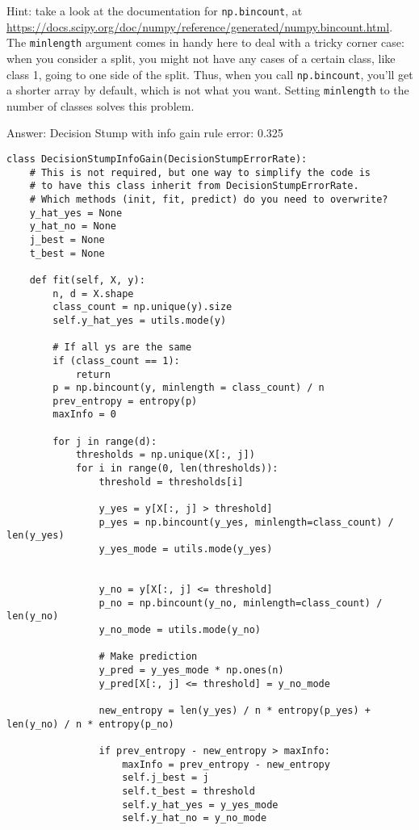 \documentclass{article}
\newcommand{\gre}[1]{\textcolor{gre}{#1}}
\newcommand\ans[1]{\par\gre{Answer: #1}}
\begin{document}
  Hint: take a look at the documentation for \texttt{np.bincount}, at \\
  \url{https://docs.scipy.org/doc/numpy/reference/generated/numpy.bincount.html}.
  The \texttt{minlength} argument comes in handy here to deal with a tricky corner case:
  when you consider a split, you might not have any cases of a certain class, like class 1,
  going to one side of the split. Thus, when you call \texttt{np.bincount}, you'll get
  a shorter array by default, which is not what you want. Setting \texttt{minlength} to the
  number of classes solves this problem.
  \ans{Decision Stump with info gain rule error: 0.325}
  \begin{verbatim}
class DecisionStumpInfoGain(DecisionStumpErrorRate):
    # This is not required, but one way to simplify the code is
    # to have this class inherit from DecisionStumpErrorRate.
    # Which methods (init, fit, predict) do you need to overwrite?
    y_hat_yes = None
    y_hat_no = None
    j_best = None
    t_best = None

    def fit(self, X, y):
        n, d = X.shape
        class_count = np.unique(y).size
        self.y_hat_yes = utils.mode(y)
        
        # If all ys are the same
        if (class_count == 1):
            return
        p = np.bincount(y, minlength = class_count) / n
        prev_entropy = entropy(p)
        maxInfo = 0

        for j in range(d):
            thresholds = np.unique(X[:, j])
            for i in range(0, len(thresholds)):
                threshold = thresholds[i]

                y_yes = y[X[:, j] > threshold]
                p_yes = np.bincount(y_yes, minlength=class_count) / len(y_yes)
                y_yes_mode = utils.mode(y_yes)


                y_no = y[X[:, j] <= threshold]
                p_no = np.bincount(y_no, minlength=class_count) / len(y_no)
                y_no_mode = utils.mode(y_no)

                # Make prediction
                y_pred = y_yes_mode * np.ones(n)
                y_pred[X[:, j] <= threshold] = y_no_mode

                new_entropy = len(y_yes) / n * entropy(p_yes) + len(y_no) / n * entropy(p_no)
                
                if prev_entropy - new_entropy > maxInfo:
                    maxInfo = prev_entropy - new_entropy
                    self.j_best = j
                    self.t_best = threshold
                    self.y_hat_yes = y_yes_mode
                    self.y_hat_no = y_no_mode
  \end{verbatim}
\end{document}
